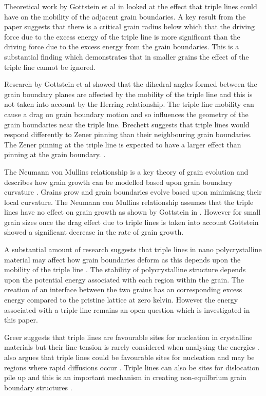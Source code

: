 \documentclass[12pt,a4paper]{book}
\begin{document}
Theoretical work by Gottstein et al in \cite{GOTTSTEIN2010914} looked at the effect that triple lines could have on the mobility of the adjacent grain boundaries. A key result from the paper suggests that there is a critical grain radius below which that the driving force due to the excess energy of the triple line is more significant than the driving force due to the excess energy from the grain boundaries. This is a substantial finding which demonstrates that in smaller grains the effect of the triple line cannot be ignored. 
 
Research by Gottstein et al \cite{GOTTSTEIN2010914} showed that the dihedral angles formed between the grain boundary planes are affected by the mobility of the triple line and this is not taken into account by the Herring relationship. The triple line mobility can cause a drag on grain boundary motion and so influences the geometry of the grain boundaries near the triple line. Brechett suggests that triple lines would respond differently to Zener pinning than their neighbouring grain boundaries. The Zener pinning at the triple line is expected to have a larger effect than pinning at the grain boundary. \cite{BRECHET2010910}.

The Neumann von Mullins relationship is a key theory of grain evolution and describes how grain growth can be modelled based upon grain boundary curvature \cite{Lazar2011}. Grains grow and grain boundaries evolve based upon minimising their local curvature. The Neumann con Mullins relationship assumes that the triple lines have no effect on grain growth as shown by Gottstein in \cite{GOTTSTEIN2010914}. However for small grain sizes once the drag effect due to triple lines is taken into account Gottstein showed a significant decrease in the rate of grain growth.

A substantial amount of research suggests that triple lines in nano polycrystalline material may affect how grain boundaries deform as this depends upon the mobility of the triple line \cite{BRECHET2010910,Shvindlerman2005, Fischer2012,
GOTTSTEIN2000, ZOLLNER201241, Miessen2015, Thomas2019}. The stability of polycrystalline structure depends upon the potential energy associated with each region within the grain. The creation of an interface between the two grains has an corresponding excess energy compared to the pristine lattice at zero kelvin. However the energy associated with a triple line remains an open question which is investigated in this paper.

Greer suggests that triple lines are favourable sites for nucleation in crystalline materials but their line tension is rarely considered when analysing the energies   \cite{GREER2010899}. \citeauthor{King2010} also argues that triple lines could be favourable sites for nucleation and may be   regions where rapid diffusions occur \cite{King2010}. Triple lines can also be sites for dislocation pile up and this is an important mechanism in creating non-equilbrium grain boundary structures \cite{Nazarov1993}. 
\end{document}
